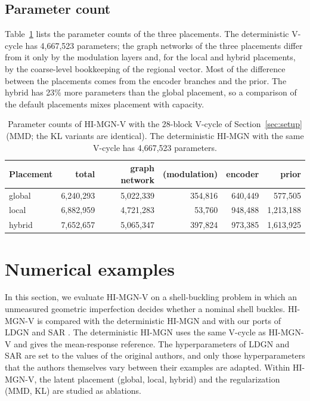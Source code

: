 \documentclass[preprint,12pt]{elsarticle}
\begin{document}
\subsection{Parameter count}\label{sec:params}

Table~\ref{tab:params} lists the parameter counts of the three placements. The deterministic
V-cycle has 4,667,523 parameters; the graph networks of the three placements differ from it only
by the modulation layers and, for the local and hybrid placements, by the coarse-level
bookkeeping of the regional vector. Most of the difference between the placements comes from the
encoder branches and the prior. The hybrid has 23\% more parameters than the global placement, so
a comparison of the default placements mixes placement with capacity.

\begin{table}[!htbp]
\centering
\small
\begin{tabular}{@{}lrrrrr@{}}
\toprule
Placement & total & graph network & (modulation) & encoder & prior \\
\midrule
global & 6,240,293 & 5,022,339 & 354,816 & 640,449 & 577,505 \\
local  & 6,882,959 & 4,721,283 & 53,760 & 948,488 & 1,213,188 \\
hybrid & 7,652,657 & 5,065,347 & 397,824 & 973,385 & 1,613,925 \\
\bottomrule
\end{tabular}
\caption{Parameter counts of HI-MGN-V with the 28-block V-cycle of Section~\ref{sec:setup}
(MMD; the KL variants are identical). The deterministic HI-MGN with the same V-cycle has
4,667,523 parameters.}
\label{tab:params}
\end{table}

\section{Numerical examples}\label{sec:numerical}

In this section, we evaluate HI-MGN-V on a shell-buckling problem in which an unmeasured
geometric imperfection decides whether a nominal shell buckles. HI-MGN-V is compared with the
deterministic HI-MGN \cite{lee2026himgn} and with our ports of LDGN and SAR
\cite{lino2025distributions,lino2026sar}. The deterministic HI-MGN uses the same V-cycle as
HI-MGN-V and gives the mean-response reference. The hyperparameters of LDGN and SAR are set to the
values of the original authors, and only those hyperparameters that the authors themselves vary
between their examples are adapted. Within HI-MGN-V, the latent placement (global, local, hybrid)
and the regularization (MMD, KL) are studied as ablations.
\end{document}
